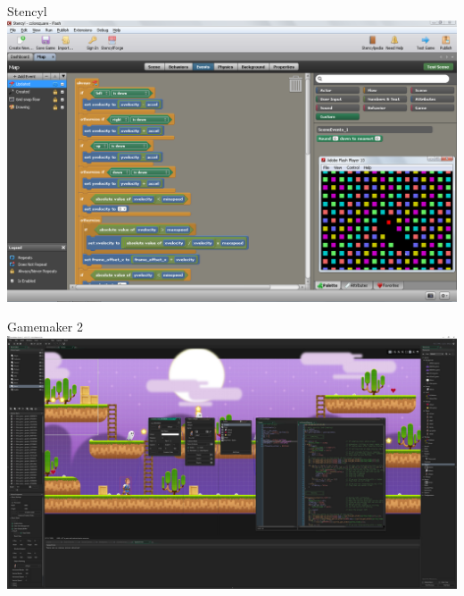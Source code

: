 \begin{frame}{Stencyl}
	\includegraphics[width=1.0\textwidth]{stencyl}
\end{frame}

\begin{frame}{Gamemaker 2}
	\includegraphics[width=1.0\textwidth]{gamemaker2}
\end{frame}